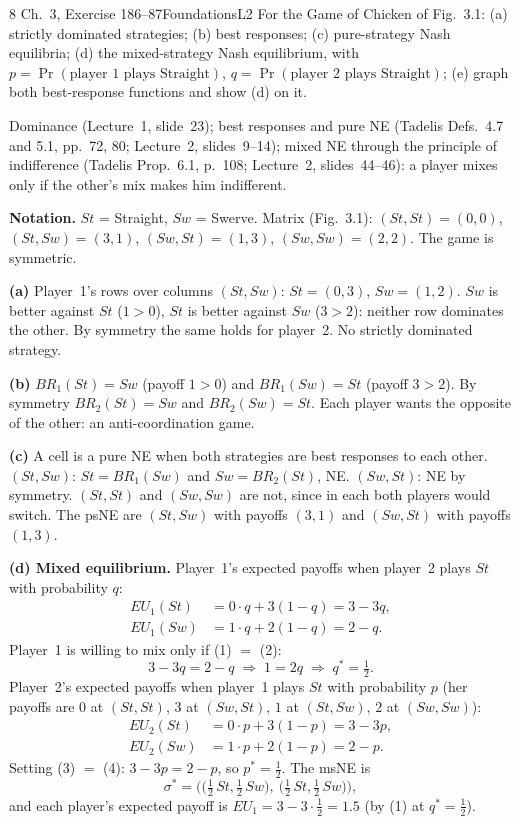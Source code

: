 \begin{exsol}{8}{\MG{} Ch.~3, Exercise 1}{86--87}{Foundations}{L2}
\asked For the Game of Chicken of Fig.~3.1: (a) strictly dominated strategies; (b) best
responses; (c) pure-strategy Nash equilibria; (d) the mixed-strategy Nash equilibrium, with
$p = \Pr(\text{player 1 plays Straight})$, $q = \Pr(\text{player 2 plays Straight})$; (e) graph
both best-response functions and show (d) on it.

\method Dominance (Lecture~1, slide~23); best responses and pure NE (Tadelis Defs.~4.7 and 5.1,
pp.~72, 80; Lecture~2, slides~9--14); mixed NE through the principle of indifference (Tadelis
Prop.~6.1, p.~108; Lecture~2, slides~44--46): a player mixes only if the other's mix makes him
indifferent.

\solution
\textbf{Notation.} $St$ = Straight, $Sw$ = Swerve. Matrix (Fig.~3.1): $(St,St) = (0,0)$,
$(St,Sw) = (3,1)$, $(Sw,St) = (1,3)$, $(Sw,Sw) = (2,2)$. The game is symmetric.

\textbf{(a)} Player~1's rows over columns $(St, Sw)$: $St = (0, 3)$, $Sw = (1, 2)$. $Sw$ is better
against $St$ ($1 > 0$), $St$ is better against $Sw$ ($3 > 2$): neither row dominates the other.
By symmetry the same holds for player~2. No strictly dominated strategy.

\textbf{(b)} $BR_1(St) = Sw$ (payoff $1 > 0$) and $BR_1(Sw) = St$ (payoff $3 > 2$). By symmetry
$BR_2(St) = Sw$ and $BR_2(Sw) = St$. Each player wants the opposite of the other: an
anti-coordination game.

\textbf{(c)} A cell is a pure NE when both strategies are best responses to each other.
$(St, Sw)$: $St = BR_1(Sw)$ and $Sw = BR_2(St)$, NE. $(Sw, St)$: NE by symmetry.
$(St,St)$ and $(Sw,Sw)$ are not, since in each both players would switch. The psNE are
$(St, Sw)$ with payoffs $(3,1)$ and $(Sw, St)$ with payoffs $(1,3)$.

\textbf{(d) Mixed equilibrium.} Player~1's expected payoffs when player~2 plays $St$ with
probability $q$:
\begin{align*}
  EU_1(St) &= 0\cdot q + 3(1-q) = 3 - 3q, \tag{1}\\
  EU_1(Sw) &= 1\cdot q + 2(1-q) = 2 - q. \tag{2}
\end{align*}
Player~1 is willing to mix only if (1) $=$ (2):
\[
  3 - 3q = 2 - q \;\Longrightarrow\; 1 = 2q \;\Longrightarrow\; q^* = \tfrac12 .
\]
Player~2's expected payoffs when player~1 plays $St$ with probability $p$ (her payoffs are
$0$ at $(St,St)$, $3$ at $(Sw,St)$, $1$ at $(St,Sw)$, $2$ at $(Sw,Sw)$):
\begin{align*}
  EU_2(St) &= 0\cdot p + 3(1-p) = 3 - 3p, \tag{3}\\
  EU_2(Sw) &= 1\cdot p + 2(1-p) = 2 - p. \tag{4}
\end{align*}
Setting (3) $=$ (4): $3 - 3p = 2 - p$, so $p^* = \tfrac12$. The msNE is
\[
  \sigma^* = \Big(\big(\tfrac12\,St, \tfrac12\,Sw\big),\ \big(\tfrac12\,St, \tfrac12\,Sw\big)\Big),
\]
and each player's expected payoff is $EU_1 = 3 - 3\cdot\tfrac12 = 1.5$ (by (1) at $q^* = \tfrac12$).


\end{exsol}
